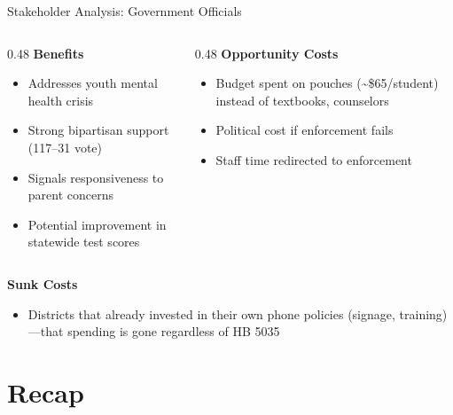 \documentclass[9pt,english,aspectratio=169]{beamer}
\begin{document}
\begin{frame}{Stakeholder Analysis: Government Officials}

  \begin{columns}[T]
    \begin{column}{0.48\textwidth}
      \textbf{\textcolor{green!60!black}{Benefits}}
      \begin{itemize}\small
        \item Addresses youth mental health crisis
        \item Strong bipartisan support (117--31 vote)
        \item Signals responsiveness to parent concerns
        \item Potential improvement in statewide test scores
      \end{itemize}
    \end{column}
    \begin{column}{0.48\textwidth}
      \textbf{\textcolor{vermillion}{Opportunity Costs}}
      \begin{itemize}\small
        \item Budget spent on pouches (\textasciitilde\$65/student) instead of textbooks, counselors
        \item Political cost if enforcement fails
        \item Staff time redirected to enforcement
      \end{itemize}
    \end{column}
  \end{columns}

  \vspace{0.6em}
  \textbf{Sunk Costs}
  \begin{itemize}\small
    \item Districts that already invested in their own phone policies (signage, training)---that spending is gone regardless of HB 5035
  \end{itemize}

\end{frame}

\section{Recap}
\end{document}
